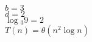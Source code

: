 \documentclass{article}
\begin{document}
                                                                                                                                                                                                                                                                                                                                                                                                                                                                                                                                                                                                $b=3$\\
                                                                                                                                                                                                                                                                                                                                                                                                                                                                                                                                                                                                        $d=2$\\
                                                                                                                                                                                                                                                                                                                                                                                                                                                                                                                                                                                                                $\log{_3}{9} = 2$\\
                                                                                                                                                                                                                                                                                                                                                                                                                                                                                                                                                                                                                        $T(n) = \theta(n^2 \log{n})$\\
                                                                                                                                                                                                                                                                                                                                                                                                                                                                                                                                                                                                                                
\end{document}
